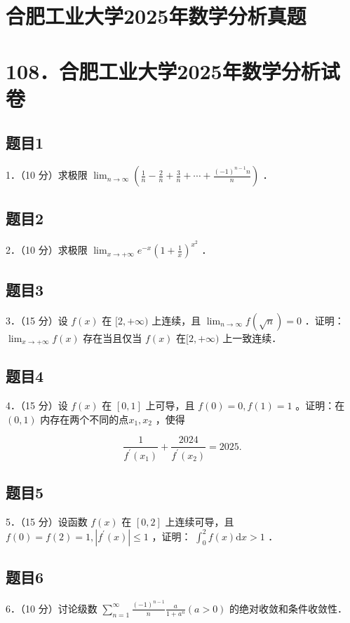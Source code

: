 \documentclass{article}
\begin{document}
\section*{合肥工业大学2025年数学分析真题}
\section*{108．合肥工业大学2025年数学分析试卷}

\subsection{题目1}
1．（10 分）求极限 \(\lim _{n \rightarrow \infty}\left(\frac{1}{n}-\frac{2}{n}+\frac{3}{n}+\cdots+\frac{(-1)^{n-1} n}{n}\right)\) ．

\subsection{题目2}
2．（10 分）求极限 \(\lim _{x \rightarrow+\infty} e^{-x}\left(1+\frac{1}{x}\right)^{x^{2}}\) ．

\subsection{题目3}
3．（15 分）设 \(f(x)\) 在 \([2,+\infty)\) 上连续，且 \(\lim _{n \rightarrow \infty} f(\sqrt{n})=0\) ．证明： \(\lim _{x \rightarrow+\infty} f(x)\) 存在当且仅当 \(f(x)\) 在\([2,+\infty)\) 上一致连续．

\subsection{题目4}
4．（15 分）设 \(f(x)\) 在 \([0,1]\) 上可导，且 \(f(0)=0, f(1)=1\) 。证明：在 \((0,1)\) 内存在两个不同的点\(x_{1}, x_{2}\) ，使得

\[
\frac{1}{f^{\prime}\left(x_{1}\right)}+\frac{2024}{f^{\prime}\left(x_{2}\right)}=2025 .
\]

\subsection{题目5}
5．（15 分）设函数 \(f(x)\) 在 \([0,2]\) 上连续可导，且 \(f(0)=f(2)=1,\left|f^{\prime}(x)\right| \leq 1\) ，证明： \(\int_{0}^{2} f(x) \mathrm{d} x>1\) ．

\subsection{题目6}
6．（10 分）讨论级数 \(\sum_{n=1}^{\infty} \frac{(-1)^{n-1}}{n} \frac{a}{1+a^{n}}(a>0)\) 的绝对收敛和条件收敛性．
\end{document}
